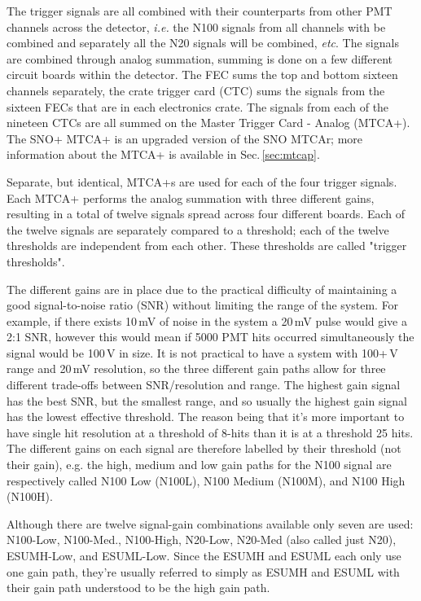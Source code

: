 The trigger signals are all combined with their counterparts from
other PMT channels across the detector, \textit{i.e.} the N100 signals
from all channels with be combined and separately all the
N20 signals will be combined, \textit{etc}.
The signals are combined through analog summation, summing is done on a few different
circuit boards within the detector.
The FEC sums the top and bottom sixteen channels separately, the crate
trigger card (CTC) sums the signals from the sixteen
FECs that are in each electronics crate.
The signals from each of the nineteen CTCs are all summed on the
Master Trigger Card - Analog (MTCA+). The SNO+ MTCA+ is an upgraded
version of the SNO MTCAr; more information about the MTCA+ is available in
Sec.\,\ref{sec:mtcap}.

Separate, but identical, MTCA+s are used for each of the four trigger signals.
Each MTCA+ performs the analog summation with three different gains,
resulting in a total of twelve signals spread across four different boards.
Each of the twelve signals are separately compared to a threshold;
each of the twelve thresholds are independent from each other.
These thresholds are called "trigger thresholds".

The different gains are in place due to the practical difficulty of maintaining
a good signal-to-noise ratio (SNR) without limiting the range of the
system.
For example, if there exists 10\,mV of noise in the system a 20\,mV pulse
would give a 2:1 SNR, however this would mean if 5000 PMT hits occurred simultaneously
the signal would be 100\,V in size.
It is not practical to have a system with 100+\,V range and 20\,mV resolution,
so the three different gain paths allow for three different trade-offs between
SNR/resolution and range.
The highest gain signal has the best SNR, but the smallest range, and so usually
the highest gain signal has the lowest effective threshold.
The reason being that it's more important to have single hit resolution at a threshold
of 8-hits than it is at a threshold 25 hits.
The different gains on each signal are therefore labelled by their threshold (not their gain), e.g.
the high, medium and low gain paths for the N100 signal are respectively called
N100 Low (N100L), N100 Medium (N100M), and N100 High (N100H).

Although there are twelve signal-gain combinations available only seven are
used: N100-Low, N100-Med., N100-High, N20-Low, N20-Med (also called just N20), ESUMH-Low, and ESUML-Low.
Since the ESUMH and ESUML each only use one gain path, they're usually
referred to simply as ESUMH and ESUML with their gain path understood to be
the high gain path.

